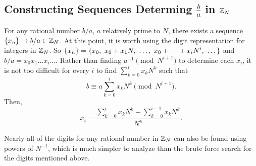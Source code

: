 \subsection{Constructing Sequences Determing $\frac{b}{a}$ in $\mathbb{Z}_N$}

\par For any rational number $b/a$, $a$ relatively prime to $N$, there
exists a sequence $\{x_n\} \rightarrow b/a \in \mathbb{Z}_N$. At this point, it is worth
using the digit representation for integers in $\mathbb{Z}_N$. So
$\xn=\{x_0, \ x_0+x_1N, \ \dots, \ x_0+\dots+x_iN^i, \ \dots\}$
and $b/a = x_0x_1\dots x_i\dots$. Rather than finding $a^{-1}\pmod{N^{i+1}}$ to
determine each $x_i$, it is not too difficult for every $i$ to find $\sum_{k=0}^ix_kN^k$
such that
\begin{equation}\label{eq:seq-rational}
  b \equiv a\sum_{k=0}^ix_kN^k \pmod{N^{i+1}}.
\end{equation}
Then, 
\begin{equation}
  x_i = \frac{\sum_{k=0}^ix_kN^k - \sum_{k=0}^{i-1}x_kN^k}{N^k}.
\end{equation}

\par Nearly all of the digits for any rational number in $\mathbb{Z}_N$ can also
be found using powers of $N^{-1}$, which is much simpler to analyze
than the brute force search for the digits mentioned above.

